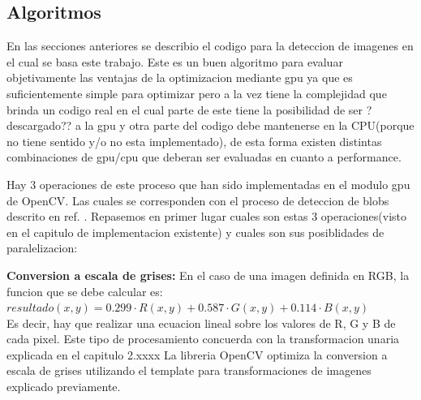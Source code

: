 \documentclass[a4paper,10pt]{report}
\begin{document}
\subsection{Algoritmos}



En las secciones anteriores se describio el codigo para la deteccion de imagenes en el cual se basa este trabajo. 
Este es un buen algoritmo para evaluar objetivamente las ventajas de la optimizacion mediante gpu ya que es suficientemente simple para optimizar pero a la vez tiene la complejidad que brinda un 
codigo real en el cual parte de este tiene la posibilidad de ser ?descargado?? a la gpu y otra parte del codigo debe mantenerse en la CPU(porque no tiene sentido y/o no esta implementado),
de esta forma existen distintas combinaciones de gpu/cpu que deberan ser evaluadas en cuanto a performance.


Hay 3 operaciones de este proceso que han sido implementadas en el modulo gpu de OpenCV. Las cuales se corresponden con el proceso de deteccion de blobs descrito en ref. \cite[capitulo 5.1]{Jaureguiberry}.
Repasemos en primer lugar cuales son estas 3 operaciones(visto en el capitulo de implementacion existente) y cuales son sus posiblidades de paralelizacion:


\textbf{Conversion a escala de grises:} En el caso de una imagen definida en RGB, la funcion que se debe calcular es: \\[0.2em]
\indent $resultado(x,y)= 0.299  \cdot R(x,y) + 0.587  \cdot G(x,y) + 0.114  \cdot B(x,y)$\\[0.2em]
\indent Es decir, hay que realizar una ecuacion lineal sobre los valores de R, G y B de cada pixel. 
Este tipo de procesamiento concuerda con la transformacion unaria explicada en el capitulo 2.xxxx
La libreria OpenCV optimiza la conversion a escala de grises utilizando el template para transformaciones de imagenes explicado previamente.
 
\end{document}
